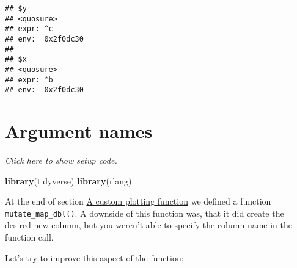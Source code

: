 \documentclass[]{book}
\newenvironment{Shaded}{\begin{snugshade}}{\end{snugshade}}
\newcommand{\ControlFlowTok}[1]{\textcolor[rgb]{0.13,0.29,0.53}{\textbf{#1}}}
\newcommand{\DecValTok}[1]{\textcolor[rgb]{0.00,0.00,0.81}{#1}}
\newcommand{\KeywordTok}[1]{\textcolor[rgb]{0.13,0.29,0.53}{\textbf{#1}}}
\newcommand{\NormalTok}[1]{#1}
\newcommand{\OperatorTok}[1]{\textcolor[rgb]{0.81,0.36,0.00}{\textbf{#1}}}
\newcommand{\StringTok}[1]{\textcolor[rgb]{0.31,0.60,0.02}{#1}}
\begin{document}
\begin{verbatim}
## $y
## <quosure>
## expr: ^c
## env:  0x2f0dc30
## 
## $x
## <quosure>
## expr: ^b
## env:  0x2f0dc30
\end{verbatim}

\hypertarget{argnames}{%
\section{Argument names}\label{argnames}}

\emph{Click here to show setup code.}

\begin{Shaded}
\begin{Highlighting}[]
\KeywordTok{library}\NormalTok{(tidyverse)}
\KeywordTok{library}\NormalTok{(rlang)}
\end{Highlighting}
\end{Shaded}

At the end of section \protect\hyperlink{colname}{A custom plotting function} we defined a function \texttt{mutate\_map\_dbl()}.
A downside of this function was, that it did create the desired new column, but you weren't able to specify the column name in the function call.

Let's try to improve this aspect of the function:

\begin{Shaded}
\end{Shaded}
\end{document}
